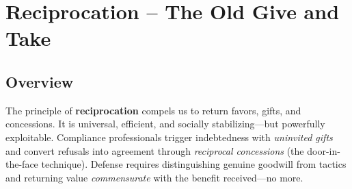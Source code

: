 \section{Reciprocation – The Old Give and Take}

\subsection*{Overview}
The principle of \textbf{reciprocation} compels us to return favors, gifts, and concessions. It is universal, efficient, and socially stabilizing—but powerfully exploitable. Compliance professionals trigger indebtedness with \emph{uninvited gifts} and convert refusals into agreement through \emph{reciprocal concessions} (the door-in-the-face technique). Defense requires distinguishing genuine goodwill from tactics and returning value \emph{commensurate} with the benefit received—no more.

